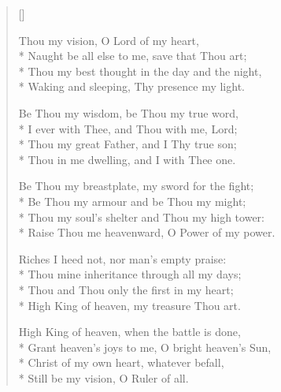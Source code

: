 \newHymn
{}
\settowidth{\versewidth}{Be Thou my vision, O Lord of my heart}
\begin{verse}[\versewidth]

 Thou my vision, O Lord of my heart,\\*
 Naught be all else to me, save that Thou art;\\*
Thou my best thought in the day and the night,\\*
Waking and sleeping, Thy presence my light.

Be Thou my wisdom, be Thou my true word,\\*
I ever with Thee, and Thou with me, Lord;\\*
Thou my great Father, and I Thy true son;\\*
Thou in me dwelling, and I with Thee one.


Be Thou my breastplate, my sword for the fight;\\*
Be Thou my armour and be Thou my might;\\*
Thou my soul's shelter and Thou my high tower:\\*
Raise Thou me heavenward, O Power of my power.


Riches I heed not, nor man's empty praise:\\*
Thou mine inheritance through all my days;\\*
Thou and Thou only the first in my heart;\\*
High King of heaven, my treasure Thou art.


High King of heaven, when the battle is done,\\*
Grant heaven's joys to me, O bright heaven's Sun,\\*
Christ of my own heart, whatever befall,\\*
Still be my vision, O Ruler of all.

\end{verse}

